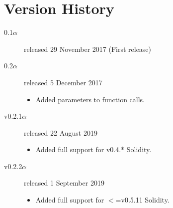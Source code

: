 \documentclass{article}
\begin{document}
  \section{Version History}
\begin{description}
\item[0.1$\alpha$] released 29 November 2017 (First release)
\item[0.2$\alpha$] released 5 December 2017
\begin{itemize}
  \item Added parameters to function calls.
\end{itemize}
\item[v0.2.1$\alpha$] released 22 August 2019
\begin{itemize}
  \item Added full support for v0.4.* Solidity.
\end{itemize}
\item[v0.2.2$\alpha$] released 1 September 2019
\begin{itemize}
  \item Added full support for $<$=v0.5.11 Solidity.
\end{itemize}
\end{description}

  
\end{document}
